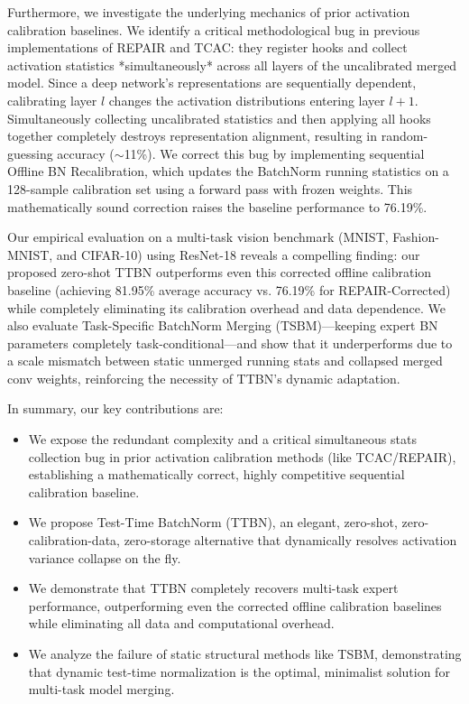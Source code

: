 \documentclass{article}
\theoremstyle{plain}
\theoremstyle{definition}
\theoremstyle{remark}
\begin{document}
Furthermore, we investigate the underlying mechanics of prior activation calibration baselines. We identify a critical methodological bug in previous implementations of REPAIR and TCAC: they register hooks and collect activation statistics *simultaneously* across all layers of the uncalibrated merged model. Since a deep network's representations are sequentially dependent, calibrating layer $l$ changes the activation distributions entering layer $l+1$. Simultaneously collecting uncalibrated statistics and then applying all hooks together completely destroys representation alignment, resulting in random-guessing accuracy ($\sim$11\%). We correct this bug by implementing sequential Offline BN Recalibration, which updates the BatchNorm running statistics on a 128-sample calibration set using a forward pass with frozen weights. This mathematically sound correction raises the baseline performance to 76.19\%.

Our empirical evaluation on a multi-task vision benchmark (MNIST, Fashion-MNIST, and CIFAR-10) using ResNet-18 reveals a compelling finding: our proposed zero-shot TTBN outperforms even this corrected offline calibration baseline (achieving 81.95\% average accuracy vs. 76.19\% for REPAIR-Corrected) while completely eliminating its calibration overhead and data dependence. We also evaluate Task-Specific BatchNorm Merging (TSBM)—keeping expert BN parameters completely task-conditional—and show that it underperforms due to a scale mismatch between static unmerged running stats and collapsed merged conv weights, reinforcing the necessity of TTBN's dynamic adaptation.

In summary, our key contributions are:
\begin{itemize}
    \item We expose the redundant complexity and a critical simultaneous stats collection bug in prior activation calibration methods (like TCAC/REPAIR), establishing a mathematically correct, highly competitive sequential calibration baseline.
    \item We propose Test-Time BatchNorm (TTBN), an elegant, zero-shot, zero-calibration-data, zero-storage alternative that dynamically resolves activation variance collapse on the fly.
    \item We demonstrate that TTBN completely recovers multi-task expert performance, outperforming even the corrected offline calibration baselines while eliminating all data and computational overhead.
    \item We analyze the failure of static structural methods like TSBM, demonstrating that dynamic test-time normalization is the optimal, minimalist solution for multi-task model merging.
\end{itemize}
\end{document}
